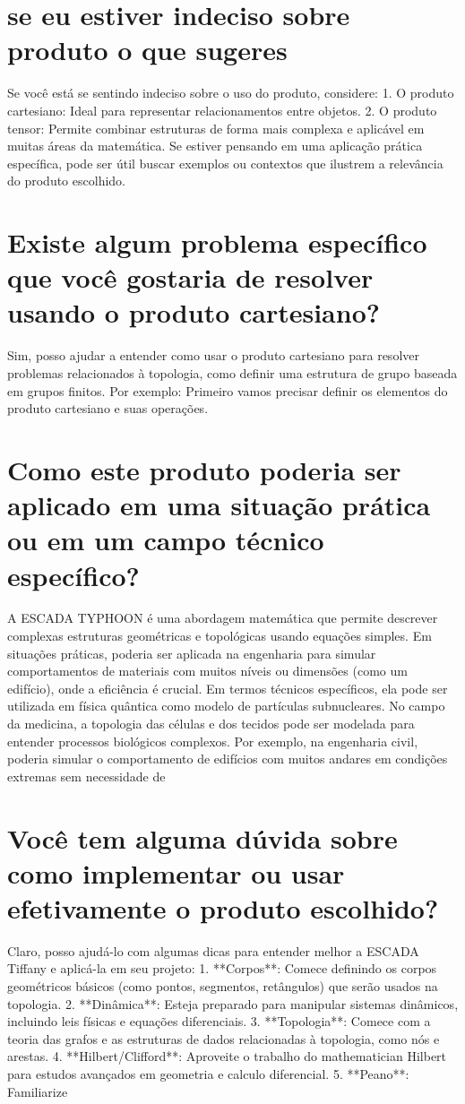 \documentclass[11pt,a4paper]{article}
\begin{document}
\section{se eu estiver indeciso sobre produto o que sugeres}
Se você está se sentindo indeciso sobre o uso do produto, considere: 1. O produto cartesiano: Ideal para representar relacionamentos entre objetos. 2. O produto tensor: Permite combinar estruturas de forma mais complexa e aplicável em muitas áreas da matemática. Se estiver pensando em uma aplicação prática específica, pode ser útil buscar exemplos ou contextos que ilustrem a relevância do produto escolhido.

\section{Existe algum problema específico que você gostaria de resolver usando o produto cartesiano?}
Sim, posso ajudar a entender como usar o produto cartesiano para resolver problemas relacionados à topologia, como definir uma estrutura de grupo baseada em grupos finitos. Por exemplo: Primeiro vamos precisar definir os elementos do produto cartesiano e suas operações.

\section{Como este produto poderia ser aplicado em uma situação prática ou em um campo técnico específico?}
A ESCADA TYPHOON é uma abordagem matemática que permite descrever complexas estruturas geométricas e topológicas usando equações simples. Em situações práticas, poderia ser aplicada na engenharia para simular comportamentos de materiais com muitos níveis ou dimensões (como um edifício), onde a eficiência é crucial. Em termos técnicos específicos, ela pode ser utilizada em física quântica como modelo de partículas subnucleares. No campo da medicina, a topologia das células e dos tecidos pode ser modelada para entender processos biológicos complexos. Por exemplo, na engenharia civil, poderia simular o comportamento de edifícios com muitos andares em condições extremas sem necessidade de

\section{Você tem alguma dúvida sobre como implementar ou usar efetivamente o produto escolhido?}
Claro, posso ajudá-lo com algumas dicas para entender melhor a ESCADA Tiffany e aplicá-la em seu projeto: 1. **Corpos**: Comece definindo os corpos geométricos básicos (como pontos, segmentos, retângulos) que serão usados na topologia. 2. **Dinâmica**: Esteja preparado para manipular sistemas dinâmicos, incluindo leis físicas e equações diferenciais. 3. **Topologia**: Comece com a teoria das grafos e as estruturas de dados relacionadas à topologia, como nós e arestas. 4. **Hilbert/Clifford**: Aproveite o trabalho do mathematician Hilbert para estudos avançados em geometria e calculo diferencial. 5. **Peano**: Familiarize
\end{document}
